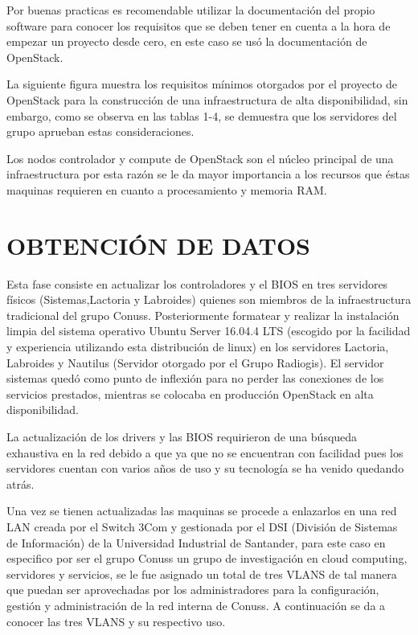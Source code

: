     Por buenas practicas es recomendable utilizar la documentación del propio software para conocer los requisitos que se deben tener en cuenta a la hora de empezar un proyecto desde cero, en este caso se usó la documentación de OpenStack. 
    
    La siguiente figura muestra los requisitos mínimos otorgados por el proyecto de OpenStack para la construcción de una infraestructura de alta disponibilidad, sin embargo, como se observa en las tablas 1-4, se demuestra que los servidores del grupo aprueban estas consideraciones.
    
   
    \label{fig:RequisitOS}
  
  Los nodos controlador y compute de OpenStack son el núcleo principal de una infraestructura por esta razón se le da mayor importancia a los recursos que éstas maquinas requieren en cuanto a procesamiento y memoria RAM. 
  
  \section{OBTENCIÓN DE DATOS} 
    
    Esta fase consiste en actualizar los controladores y el BIOS en tres servidores físicos (Sistemas,Lactoria y Labroides) quienes son miembros de la infraestructura tradicional del grupo Conuss. Posteriormente formatear y realizar la instalación limpia del sistema operativo Ubuntu Server 16.04.4 LTS (escogido por la facilidad y experiencia utilizando esta distribución de linux) en los servidores Lactoria, Labroides y Nautilus (Servidor otorgado por el Grupo Radiogis). El servidor sistemas quedó como punto de inflexión para no perder las conexiones de los servicios prestados, mientras se colocaba en producción OpenStack en alta disponibilidad.
    
    La actualización de los drivers y las BIOS requirieron de una búsqueda exhaustiva en la red debido a que ya que no se encuentran con facilidad pues los servidores cuentan con varios años de uso y su tecnología se ha venido quedando atrás.
    
    Una vez se tienen actualizadas las maquinas se procede a enlazarlos en una red LAN creada por el Switch 3Com y gestionada por el DSI (División de Sistemas de Información) de la Universidad Industrial de Santander, para este caso en especifico por ser el grupo Conuss un grupo de investigación en cloud computing, servidores y servicios, se le fue asignado un total de tres VLANS de tal manera que puedan ser aprovechadas por los administradores para la configuración, gestión y administración de la red interna de Conuss.
    A continuación se da a conocer las tres VLANS y su respectivo uso.
    
